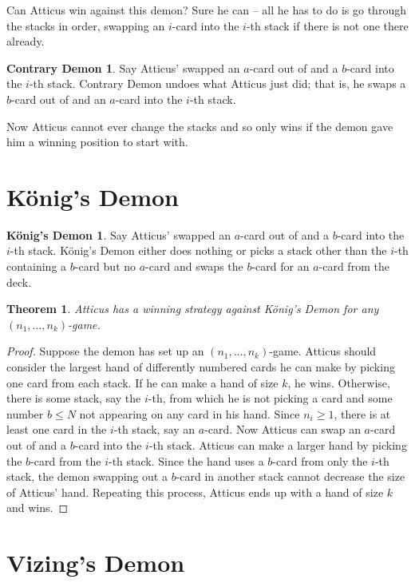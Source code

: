 \documentclass[12pt]{article}
\theoremstyle{plain}
\newtheorem{thm}{Theorem}
\theoremstyle{definition}
\newtheorem*{contrary_demon}{Contrary Demon}
\newtheorem*{konig_demon}{K\"onig's Demon}
\theoremstyle{remark}
\newcommand{\parens}[1]{\left( #1 \right)}
\begin{document}
Can Atticus win against this demon?  Sure he can -- all he has to do is go through the stacks in order, swapping an $i$-card into the $i$-th stack if there is not one there already.  

\begin{contrary_demon}
Say Atticus' swapped an $a$-card out of and a $b$-card into the $i$-th stack.  Contrary Demon undoes what Atticus just did; that is, he swaps a $b$-card out of and an $a$-card into the $i$-th stack.
\end{contrary_demon}

Now Atticus cannot ever change the stacks and so only wins if the demon gave him a winning position to start with.

\section{K\"onig's Demon}

\begin{konig_demon}
Say Atticus' swapped an $a$-card out of and a $b$-card into the $i$-th stack.
K\"onig's Demon either does nothing or picks a stack other than the $i$-th containing a $b$-card but no $a$-card and swaps the $b$-card for an $a$-card from the deck.
\end{konig_demon}

\begin{thm}
Atticus has a winning strategy against K\"onig's Demon for any $\parens{n_1, \ldots, n_k}$-game.
\end{thm}
\begin{proof}
Suppose the demon has set up an $(n_1, \ldots, n_k)$-game.  Atticus should consider the largest hand of differently numbered cards he can make by picking one card from each stack.  If he can make a hand of size $k$, he wins.  Otherwise, there is some stack, say the $i$-th, from which he is not picking a card and some number $b \leq N$ not appearing on any card in his hand.  Since $n_i \geq 1$, there is at least one card in the $i$-th stack, say an $a$-card.  Now Atticus can swap an $a$-card out of and a $b$-card into the $i$-th stack.  Atticus can make a larger hand by picking the $b$-card from the $i$-th stack.  Since the hand uses a $b$-card from only the $i$-th stack, the demon swapping out a $b$-card in another stack cannot decrease the size of Atticus' hand.  Repeating this process, Atticus ends up with a hand of size $k$ and wins.
\end{proof}

\section{Vizing's Demon}
\end{document}
